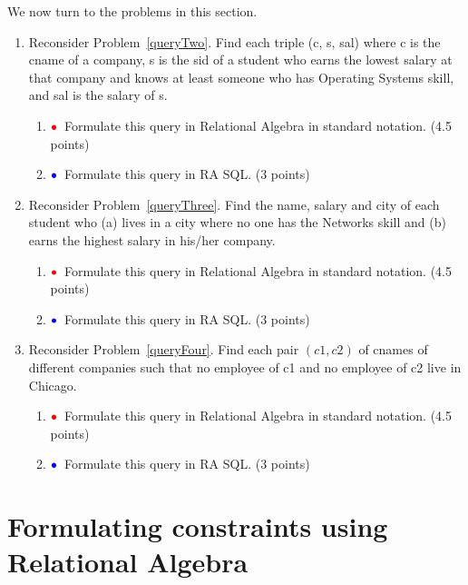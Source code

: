 \documentclass[11pt]{article}
\newcommand{\red}[1]{{\color{red}#1}}
\newcommand{\blue}[1]{{\color{blue}#1}}
\newcommand{\redbullet}{$\red{\bullet}$}
\newcommand{\bluebullet}{$\blue{\bullet}$}
\begin{document}
\newpage

We now turn to the problems in this section.
\begin{enumerate}[resume]
\item Reconsider Problem~\ref{queryTwo}.
Find each triple (c, s, sal) where c is the cname of a company, s is the sid of a student who earns the lowest salary at that company and knows at least someone who has Operating Systems skill, and sal is the salary of s.
\begin{enumerate}
\item  \redbullet\  Formulate this query in Relational Algebra in standard notation. (4.5 points)

\item \bluebullet\  Formulate this query in RA SQL. (3 points)
\end{enumerate}



\item Reconsider Problem~\ref{queryThree}.
Find the name, salary and city of each student who 
(a) lives in a city where no one has the Networks skill and 
(b) earns the highest salary in his/her company.

\begin{enumerate}
\item  \redbullet\ Formulate this query in Relational Algebra in standard notation. (4.5 points)


\item   \bluebullet\ Formulate this query in RA SQL. (3 points)

\end{enumerate}
\item Reconsider Problem~\ref{queryFour}.  Find each pair $(c1,c2)$ of cnames of different companies such that
no employee of c1 and no employee of c2 live in Chicago.
\begin{enumerate}
\item  \redbullet\ Formulate this query in Relational Algebra in standard notation. (4.5 points)


\item   \bluebullet\ 
Formulate this query in RA SQL. (3 points)
\end{enumerate}

\end{enumerate}

\newpage
\section{Formulating constraints using Relational Algebra}
\end{document}
